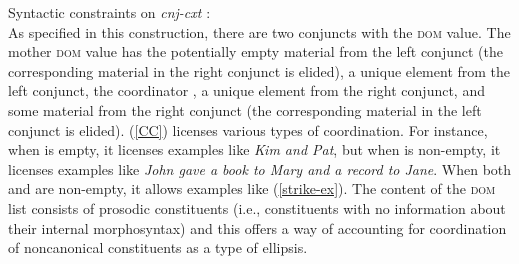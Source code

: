 {\ea\label{CC}
Syntactic constraints on \emph{cnj-cxt} \citep[27]{Beavers2004}:\\
 \impl
{}
\z
%
%
%
%
As specified in this construction, there are two conjuncts with the \textsc{dom} value.
The mother \textsc{dom} value has the potentially empty material  from the left conjunct (the corresponding material in the right conjunct is elided), a unique element  from the left
conjunct, the coordinator , a unique element  from
the right conjunct, and some material  from the right 
conjunct (the corresponding material in the left conjunct is elided). (\ref{CC}) licenses various types of coordination. For instance, 
when  is empty, it licenses examples like
\emph{Kim and Pat}, but when  is non-empty, it licenses examples like \emph{John gave a book to Mary and a record
to Jane}. %
When
both  and  are non-empty, it allows examples 
like (\ref{strike-ex}). The content of the \textsc{dom} list consists of prosodic constituents (i.e., constituents with no information about their internal morphosyntax) and this offers a way of accounting for coordination of noncanonical constituents as a type of ellipsis.
 
%
 
}
